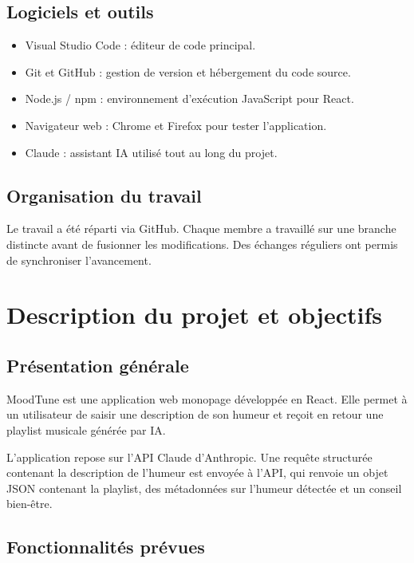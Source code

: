 \documentclass[a4paper, 12pt, twoside]{article}
\begin{document}
\subsection{Logiciels et outils}

\begin{itemize}
    \item Visual Studio Code : éditeur de code principal.
    \item Git et GitHub : gestion de version et hébergement du code source.
    \item Node.js / npm : environnement d'exécution JavaScript pour React.
    \item Navigateur web : Chrome et Firefox pour tester l'application.
    \item Claude : assistant IA utilisé tout au long du projet.
\end{itemize}

\subsection{Organisation du travail}

Le travail a été réparti via GitHub. Chaque membre a travaillé sur une branche distincte avant de fusionner les modifications. Des échanges réguliers ont permis de synchroniser l'avancement.

\section{Description du projet et objectifs}

\subsection{Présentation générale}

MoodTune est une application web monopage développée en React. Elle permet à un utilisateur de saisir une description de son humeur et reçoit en retour une playlist musicale générée par IA.

L'application repose sur l'API Claude d'Anthropic. Une requête structurée contenant la description de l'humeur est envoyée à l'API, qui renvoie un objet JSON contenant la playlist, des métadonnées sur l'humeur détectée et un conseil bien-être.

\subsection{Fonctionnalités prévues}
\end{document}
